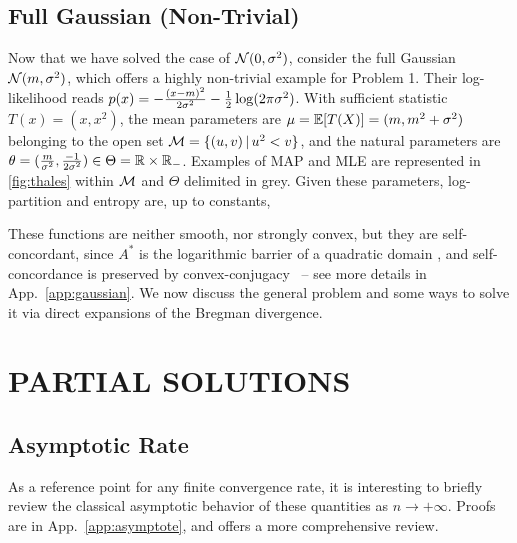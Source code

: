 \documentclass[twoside]{article}
\newcommand{\cond}{\,\vert\,}
\newcommand{\logpart}{A}
\newcommand{\conj}{{\logpart^*}}
\newcommand{\nat}{\theta}
\newcommand{\m}{\mu}
\begin{document}
\subsection{Full Gaussian (Non-Trivial)}
\label{ssec:gaussian}
Now that we have solved the case of ${\mathcal N}(0,\sigma^2)$, consider the full Gaussian ${\mathcal N}(m,\sigma^2)$, which offers a highly non-trivial example for Problem 1.
Their log-likelihood reads $p(x) = -\frac{(x-m)^2}{2 \sigma^2} - \frac{1}{2} \log(2\pi\sigma^2)$.
With sufficient statistic $T(x)=(x, x^2)$,
the mean parameters are $\m = \E[T(X)] = (m , m^2 + \sigma^2)$ belonging to the open set $\cM= \{(u,v) \cond u^2 < v\}$,
and the natural parameters are $\nat= (\frac{m}{\sigma^2} , \frac{-1}{2\sigma^2}) \in \Theta = \real \times \real_-$.
Examples of MAP and MLE  are represented in \cref{fig:thales} within ${\mathcal M}$ and $\Theta$ delimited in grey.
Given these parameters, log-partition and entropy are, up to constants,
\alignn{
	\textstyle \logpart(\nat) &= \textstyle \frac{\nat_1^2}{-4\nat_2} - \half \log(-\nat_2) \\ 
	\textstyle \conj(\m) &= \textstyle - \half \log (\mu_2 - \mu_1^2)
}

These functions are neither smooth, nor strongly convex, but they are self-concordant, since $\conj$ is  the logarithmic barrier of a quadratic domain
\citep[p.177, example 4.1.1.4]{nesterov2003introductory}, and self-concordance is preserved by convex-conjugacy~\citep{nesterov1994interior} -- see more details in App.~\ref{app:gaussian}.
We now discuss the general problem and some ways to solve it via direct expansions of the Bregman divergence.

\section{PARTIAL SOLUTIONS}
\label{sec:insights}

\subsection{Asymptotic Rate}
\label{ssec:asymptote}
As a reference point for any finite convergence rate, it is interesting to briefly review the classical asymptotic behavior of these quantities as $n \rightarrow +\infty$.
Proofs are in App.~\ref{app:asymptote}, and \citet[\S1.1]{ostrovskii2021finite} offers a more comprehensive review.
\end{document}

